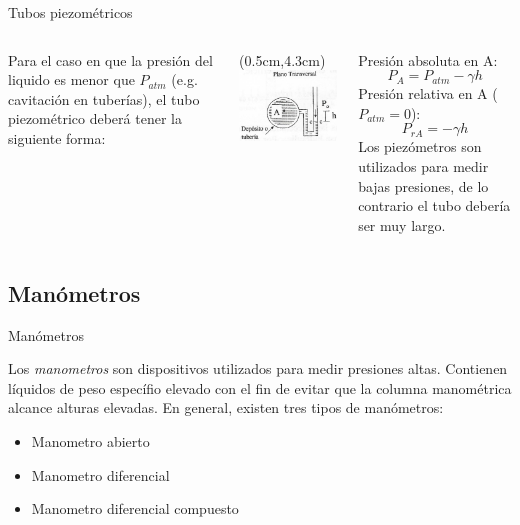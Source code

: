 \documentclass [xcolor=svgnames, t] {beamer}
\begin{document}
\begin{frame}{Tubos piezom\'etricos}
\begin{columns}
Para el caso en que la presi\'on del liquido es menor que $P_{atm}$ (e.g. cavitaci\'on en tuber\'ias), el tubo piezom\'etrico deber\'a tener la siguiente forma:
\begin{textblock*}{5.5cm}(0.5cm,4.3cm) %
\includegraphics[width=\textwidth]{mano216}
\end{textblock*}
Presi\'on absoluta en A:
$$
P_A = P_{atm}-\gamma h
$$
Presi\'on relativa en A ($P_{atm}=0$):
$$
P_{rA} = -\gamma h
$$
Los piez\'ometros son utilizados para medir bajas presiones, de lo contrario el tubo deber\'ia ser muy largo. 
\end{columns}
\end{frame}


\subsection{Man\'ometros}
\begin{frame}{Man\'ometros}
\begin{block}{}
Los \emph{manometros} son dispositivos utilizados para medir presiones altas. Contienen l\'iquidos de peso espec\'ifio elevado con el fin de evitar que la columna manom\'etrica alcance alturas elevadas. En general, existen tres tipos de man\'ometros:
\begin{itemize}
\item Manometro abierto
\item Manometro diferencial
\item Manometro diferencial compuesto
\end{itemize}
\end{block}
\end{frame}
\end{document}
